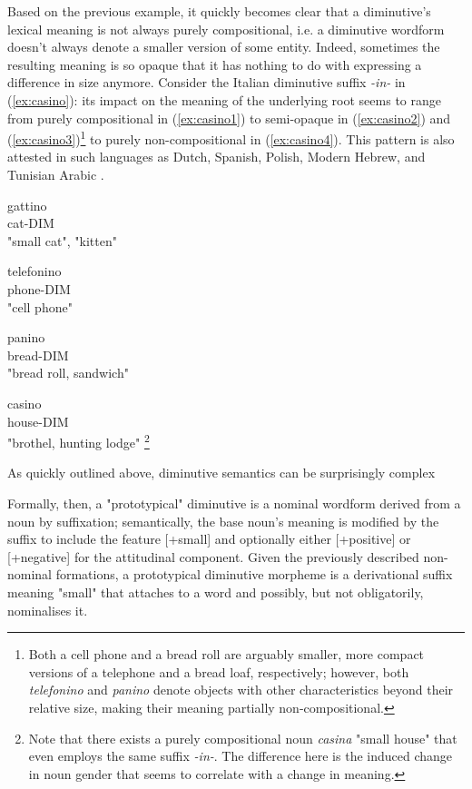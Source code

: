 Based on the previous example, it quickly becomes clear that a diminutive's lexical meaning is not always purely compositional, i.e. a diminutive wordform doesn't always denote a smaller version of some entity. Indeed, sometimes the resulting meaning is so opaque that it has nothing to do with expressing a difference in size anymore. Consider the Italian diminutive suffix \textit{-in-} in (\ref{ex:casino}): its impact on the meaning of the underlying root seems to range from purely compositional in (\ref{ex:casino1}) to semi-opaque in (\ref{ex:casino2}) and (\ref{ex:casino3})\footnote{Both a cell phone and a bread roll are arguably smaller, more compact versions of a telephone and a bread loaf, respectively; however, both \textit{telefonino} and \textit{panino} denote objects with other characteristics beyond their relative size, making their meaning partially non-compositional.} to purely non-compositional in (\ref{ex:casino4}). This pattern is also attested in such languages as Dutch, Spanish, Polish, Modern Hebrew, and Tunisian Arabic \parencite[see][for detailed examples]{DeBelder+etal+2014}.

\begin{exe}
\ex \label{ex:casino} 
\begin{xlist}
\ex \label{ex:casino1} \gll
gattino \\
cat-DIM \\
\trans "small cat", "kitten"

\ex \label{ex:casino2} \gll
telefonino \\
phone-DIM \\
\trans "cell phone"

\ex \label{ex:casino3} \gll
panino \\
bread-DIM \\
\trans "bread roll, sandwich"

\ex \label{ex:casino4} \gll
casino \\
house-DIM \\
\trans "brothel, hunting lodge"
\footnote{Note that there exists a purely compositional noun \textit{casina} "small house" that even employs the same suffix \textit{-in-}. The difference here is the induced change in noun gender that seems to correlate with a change in meaning.}
\end{xlist}
\end{exe}

As quickly outlined above, diminutive semantics can be surprisingly complex

Formally, then, a "prototypical" diminutive is a nominal wordform derived from a noun by suffixation; semantically, the base noun's meaning is modified by the suffix to include the feature [+small] and optionally either [+positive] or [+negative] for the attitudinal component. Given the previously described non-nominal formations, a prototypical diminutive morpheme is a derivational suffix meaning "small" that attaches to a word and possibly, but not obligatorily, nominalises it.

